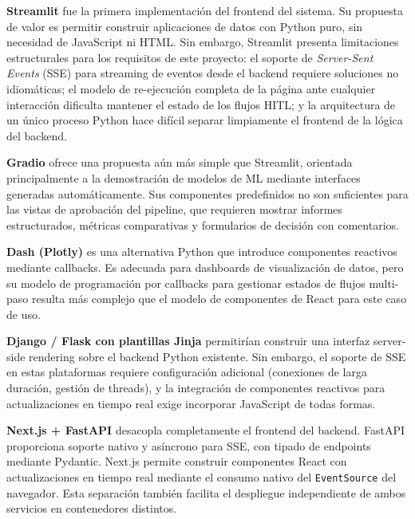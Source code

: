 \textbf{Streamlit} fue la primera implementación del frontend del sistema. Su propuesta de valor es permitir construir aplicaciones de datos con Python puro, sin necesidad de JavaScript ni HTML. Sin embargo, Streamlit presenta limitaciones estructurales para los requisitos de este proyecto: el soporte de \emph{Server-Sent Events} (SSE) para streaming de eventos desde el backend requiere soluciones no idiomáticas; el modelo de re-ejecución completa de la página ante cualquier interacción dificulta mantener el estado de los flujos HITL; y la arquitectura de un único proceso Python hace difícil separar limpiamente el frontend de la lógica del backend.

\textbf{Gradio} ofrece una propuesta aún más simple que Streamlit, orientada principalmente a la demostración de modelos de ML mediante interfaces generadas automáticamente. Sus componentes predefinidos no son suficientes para las vistas de aprobación del pipeline, que requieren mostrar informes estructurados, métricas comparativas y formularios de decisión con comentarios.

\textbf{Dash (Plotly)} es una alternativa Python que introduce componentes reactivos mediante callbacks. Es adecuada para dashboards de visualización de datos, pero su modelo de programación por callbacks para gestionar estados de flujos multi-paso resulta más complejo que el modelo de componentes de React para este caso de uso.

\textbf{Django / Flask con plantillas Jinja} permitirían construir una interfaz server-side rendering sobre el backend Python existente. Sin embargo, el soporte de SSE en estas plataformas requiere configuración adicional (conexiones de larga duración, gestión de threads), y la integración de componentes reactivos para actualizaciones en tiempo real exige incorporar JavaScript de todas formas.

\textbf{Next.js + FastAPI} desacopla completamente el frontend del backend. FastAPI proporciona soporte nativo y asíncrono para SSE, con tipado de endpoints mediante Pydantic. Next.js permite construir componentes React con actualizaciones en tiempo real mediante el consumo nativo del \texttt{EventSource} del navegador. Esta separación también facilita el despliegue independiente de ambos servicios en contenedores distintos.

